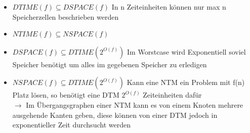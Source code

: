 \documentclass[12pt,a4paper]{article}
\begin{document}
\begin{itemize}
\item $DTIME(f) \subseteq DSPACE(f)$ In n Zeiteinheiten können nur max n Speicherzellen beschrieben werden
\item $NTIME(f) \subseteq NSPACE(f)$
\item $DSPACE(f) \subseteq DTIME(2^{O(f)})$ Im Worstcase wird Exponentiell soviel Speicher benötigt um alles im gegebenen Speicher zu erledigen
\item $NSPACE(f) \subseteq DTIME(2^{O(f)})$ Kann eine NTM ein Problem mit f(n) Platz lösen, so benötigt eine DTM $2^{O(f)}$ Zeiteinheiten dafür\\

\textbf{$\rightarrow$}
Im Übergangsgraphen einer NTM kann es von einem Knoten mehrere ausgehende Kanten geben, diese können von einer DTM jedoch in exponentieller Zeit durchsucht werden
\end{itemize}
\end{document}
